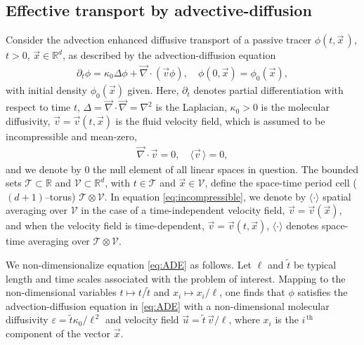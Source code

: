 \documentclass[11pt]{amsart}
\newcommand{\Tc}{\mathcal{T}}
\newcommand{\Vc}{\mathcal{V}}
\begin{document}
\subsection{Effective transport by
  advective-diffusion} \label{sec:Eff_Trans}  
%
Consider the advection enhanced diffusive transport of a passive
tracer $\phi(t,\vec{x}\,)$, $t>0$, $\vec{x}\in\mathbb{R}^d$, as described by
the advection-diffusion equation 
%
\begin{align}\label{eq:ADE}
  \partial_t\phi=\kappa_0\Delta \phi+\vec{\nabla}\cdot(\vec{v}\phi), \quad
  \phi(0,\vec{x})=\phi_0(\vec{x}),
\end{align}
% 
with initial density $\phi_0(\vec{x})$ given. Here, $\partial_t$ denotes partial
differentiation with respect to time $t$, $\Delta=\vec{\nabla}\cdot\vec{\nabla}=\nabla^2$ is
the Laplacian, $\kappa_0>0$ is the molecular diffusivity,
$\vec{v}=\vec{v}(t,\vec{x})$ is the fluid velocity field, which is
assumed to be incompressible and mean-zero, 
%
\begin{align}\label{eq:incompressible}
  \vec{\nabla}\cdot\vec{v}=0, \quad
  \langle\vec{v}\,\rangle=0,
\end{align}
%
and we denote by $0$ the null element of all linear spaces in
question. The bounded sets $\Tc\subset\mathbb{R}$ and  
$\Vc\subset\mathbb{R}^d$, with $t\in\Tc$ and $\vec{x}\in\Vc$, define the
space-time period cell ($(d+1)$--torus) $\Tc\otimes\Vc$. In equation
\eqref{eq:incompressible}, we denote by $\langle\cdot\rangle$ spatial averaging over
$\Vc$ in the case of a time-independent velocity field,
$\vec{v}=\vec{v}(\vec{x})$, and when the velocity field is
time-dependent, $\vec{v}=\vec{v}(t,\vec{x})$, $\langle\cdot\rangle$ denotes space-time
averaging over $\Tc\otimes\Vc$. 



We non-dimensionalize equation
\eqref{eq:ADE} as follows. Let $\ell$ and $\tilde{t}$ be typical length and time 
scales associated with the problem of interest. Mapping to the
non-dimensional variables $t\mapsto t/\tilde{t}$ and $x_i\mapsto x_i/\ell$, one finds that
$\phi$ satisfies the advection-diffusion 
equation in \eqref{eq:ADE} with a non-dimensional molecular
diffusivity $\varepsilon=\tilde{t}\kappa_0/\ell^{\,2}$ and velocity field
$\vec{u}=\tilde{t}\,\vec{v}/\ell$, where $x_i$ is the $i^{\,\text{th}}$
component of the vector $\vec{x}$.
\end{document}
